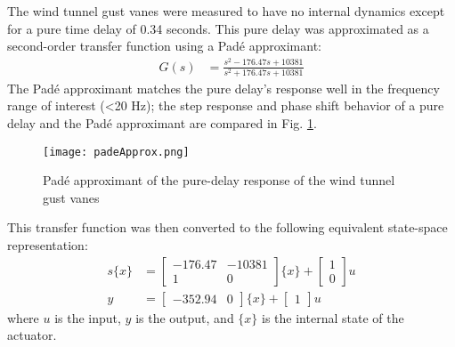 The wind tunnel gust vanes were measured to have no internal dynamics except for a pure time delay of 0.34 seconds. This pure delay was approximated as a second-order transfer function using a Pad\'e approximant:
\begin{align}
    G(s) &= \frac{s^2 - 176.47s + 10381}{s^2 + 176.47s + 10381}
\end{align}
The Pad\'e approximant matches the pure delay's response well in the frequency range of interest (<20 Hz); the step response and phase shift behavior of a pure delay and the Pad\'e approximant are compared in Fig. \ref{fig:padeApprox}.
\begin{figure}[H]
    \centering
    \texttt{[image: padeApprox.png]}
    \label{fig:padeApprox}
    \caption{Pad\'e approximant of the pure-delay response of the wind tunnel gust vanes}
\end{figure}
This transfer function was then converted to the following equivalent state-space representation:
\begin{equation}
\begin{aligned}
\label{eq:gustModel}
    s\{x\} &= \begin{bmatrix} -176.47 & -10381 \\ 1 & 0 \end{bmatrix} \{x\}
        + \begin{bmatrix} 1 \\ 0 \end{bmatrix} u \\
    y &= \begin{bmatrix} -352.94 & 0 \end{bmatrix} \{x\}
        + \begin{bmatrix} 1 \end{bmatrix} u
\end{aligned}
\end{equation}
where $u$ is the input, $y$ is the output, and $\{x\}$ is the internal state of the actuator.


